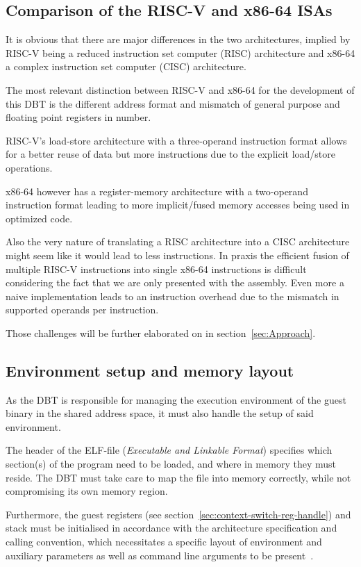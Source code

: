 
\subsection{Comparison of the RISC-V and x86-64 ISAs}
\label{sec:isa-cmp}
It is obvious that there are major differences in the two architectures, implied by RISC-V being a reduced instruction set computer (RISC) architecture and x86-64 a complex instruction set computer (CISC) architecture.

The most relevant distinction between RISC-V and x86-64 for the development of this DBT is the different address format and mismatch of general purpose and floating point registers in number.

RISC-V's load-store architecture with a three-operand instruction format allows for a better reuse of data but more instructions due to the explicit load/store operations.

x86-64 however has a register-memory architecture with a two-operand instruction format leading to more implicit/fused memory accesses being used in optimized code.

Also the very nature of translating a RISC architecture into a CISC architecture might seem like it would lead to less instructions.
In praxis the efficient fusion of multiple RISC-V instructions into single x86-64 instructions is difficult considering the fact that we are only presented with the assembly.
Even more a naive implementation leads to an instruction overhead due to the mismatch in supported operands per instruction.

Those challenges will be further elaborated on in section~\ref{sec:Approach}.

\subsection{Environment setup and memory layout}
\label{sec:memory-layout}
As the DBT is responsible for managing the execution environment of the guest binary in the shared address space, it must also handle the setup of said environment.

The header of the ELF-file (\textit{Executable and Linkable Format}) specifies which section(s) of the program need to be loaded, and where in memory they must reside.
The DBT must take care to map the file into memory correctly, while not compromising its own memory region.

Furthermore, the guest registers (see section~\vref{sec:context-switch-reg-handle}) and stack must be initialised in accordance with the architecture specification and calling convention, which necessitates a specific layout of environment and auxiliary parameters as well as command line arguments to be present~\cite[S. 2]{bintrans}.

